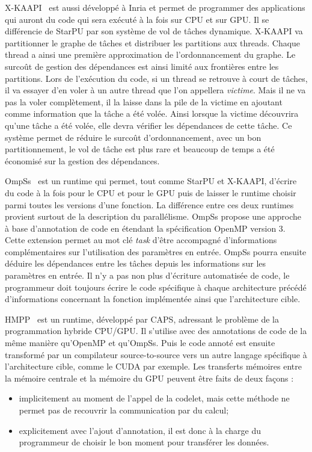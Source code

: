 X-KAAPI~\cite{xkaapi} est aussi développé à Inria et permet de programmer des applications qui auront du code qui sera exécuté à la fois sur CPU et sur GPU.
%
Il se différencie de StarPU par son système de vol de tâches dynamique.
%
X-KAAPI va partitionner le graphe de tâches et distribuer les partitions aux threads.
%
Chaque thread a ainsi une première approximation de l'ordonnancement du graphe.
%
Le surcoût de gestion des dépendances est ainsi limité aux frontières entre les partitions.
%
Lors de l'exécution du code, si un thread se retrouve à court de tâches, il va essayer d'en voler à un autre thread que l'on appellera {\em victime}.
%
Mais il ne va pas la voler complètement, il la laisse dans la pile de la victime en ajoutant comme information que la tâche a été volée.
%
Ainsi lorsque la victime découvrira qu'une tâche a été volée, elle devra vérifier les dépendances de cette tâche.
%
Ce système permet de réduire le surcoût d'ordonnancement, avec un bon partitionnement, le vol de tâche est plus rare et beaucoup de temps a été économisé sur la gestion des dépendances.

OmpSs~\cite{OMPSs} est un runtime qui permet, tout comme StarPU et X-KAAPI, d'écrire du code à la fois pour le CPU et pour le GPU puis de laisser le runtime choisir parmi toutes les versions d'une fonction.
%
La différence entre ces deux runtimes provient surtout de la description du parallélisme.
%
OmpSs propose une approche à base d'annotation de code en étendant la spécification OpenMP version 3.
%
Cette extension permet au mot clé {\em task} d'être accompagné d'informations complémentaires sur l'utilisation des paramètres en entrée.
%
OmpSs pourra ensuite déduire les dépendances entre les tâches depuis les informations sur les paramètres en entrée.
%
Il n'y a pas non plus d'écriture automatisée de code, le programmeur doit toujours écrire le code spécifique à chaque architecture précédé d'informations concernant la fonction implémentée ainsi que l'architecture cible.

HMPP~\cite{hmpp} est un runtime, développé par CAPS, adressant le problème de la programmation hybride CPU/GPU.
%
Il s'utilise avec des annotations de code de la même manière qu'OpenMP et qu'OmpSs.
%
Puis le code annoté est ensuite transformé par un compilateur source-to-source vers un autre langage spécifique à l'architecture cible, comme le CUDA par exemple.
%
Les transferts mémoires entre la mémoire centrale et la mémoire du GPU peuvent être faits de deux façons :
\begin{itemize}
  \item implicitement au moment de l'appel de la codelet, mais cette méthode ne permet pas de recouvrir la communication par du calcul;
  \item explicitement avec l'ajout d'annotation, il est donc à la charge du programmeur de choisir le bon moment pour transférer les données.
\end{itemize}
%

